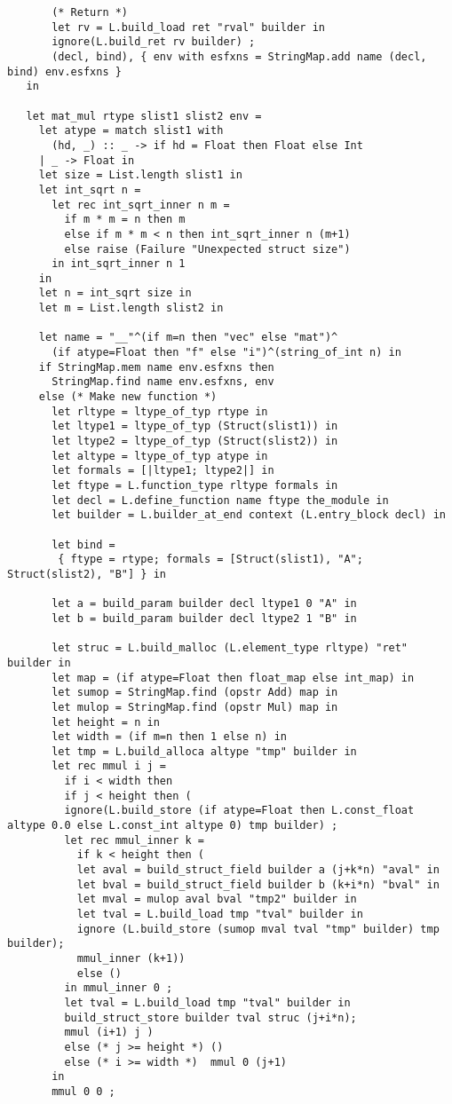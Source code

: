\documentclass[main.tex]{subfiles}
\begin{document}
\begin{lstlisting}
       (* Return *)
       let rv = L.build_load ret "rval" builder in
       ignore(L.build_ret rv builder) ;
       (decl, bind), { env with esfxns = StringMap.add name (decl, bind) env.esfxns }
   in

   let mat_mul rtype slist1 slist2 env =
     let atype = match slist1 with
       (hd, _) :: _ -> if hd = Float then Float else Int
     | _ -> Float in
     let size = List.length slist1 in
     let int_sqrt n = 
       let rec int_sqrt_inner n m = 
         if m * m = n then m
         else if m * m < n then int_sqrt_inner n (m+1)
         else raise (Failure "Unexpected struct size")
       in int_sqrt_inner n 1
     in
     let n = int_sqrt size in
     let m = List.length slist2 in

     let name = "__"^(if m=n then "vec" else "mat")^
       (if atype=Float then "f" else "i")^(string_of_int n) in
     if StringMap.mem name env.esfxns then
       StringMap.find name env.esfxns, env
     else (* Make new function *)
       let rltype = ltype_of_typ rtype in
       let ltype1 = ltype_of_typ (Struct(slist1)) in
       let ltype2 = ltype_of_typ (Struct(slist2)) in
       let altype = ltype_of_typ atype in
       let formals = [|ltype1; ltype2|] in
       let ftype = L.function_type rltype formals in
       let decl = L.define_function name ftype the_module in
       let builder = L.builder_at_end context (L.entry_block decl) in

       let bind =
        { ftype = rtype; formals = [Struct(slist1), "A"; Struct(slist2), "B"] } in
       
       let a = build_param builder decl ltype1 0 "A" in
       let b = build_param builder decl ltype2 1 "B" in

       let struc = L.build_malloc (L.element_type rltype) "ret" builder in
       let map = (if atype=Float then float_map else int_map) in
       let sumop = StringMap.find (opstr Add) map in
       let mulop = StringMap.find (opstr Mul) map in
       let height = n in
       let width = (if m=n then 1 else n) in
       let tmp = L.build_alloca altype "tmp" builder in
       let rec mmul i j =
         if i < width then
         if j < height then (
         ignore(L.build_store (if atype=Float then L.const_float altype 0.0 else L.const_int altype 0) tmp builder) ;
         let rec mmul_inner k = 
           if k < height then (
           let aval = build_struct_field builder a (j+k*n) "aval" in
           let bval = build_struct_field builder b (k+i*n) "bval" in
           let mval = mulop aval bval "tmp2" builder in
           let tval = L.build_load tmp "tval" builder in
           ignore (L.build_store (sumop mval tval "tmp" builder) tmp builder);
           mmul_inner (k+1))
           else ()
         in mmul_inner 0 ;
         let tval = L.build_load tmp "tval" builder in
         build_struct_store builder tval struc (j+i*n);
         mmul (i+1) j )
         else (* j >= height *) ()
         else (* i >= width *)  mmul 0 (j+1)
       in
       mmul 0 0 ;


\end{lstlisting}
\end{document}
